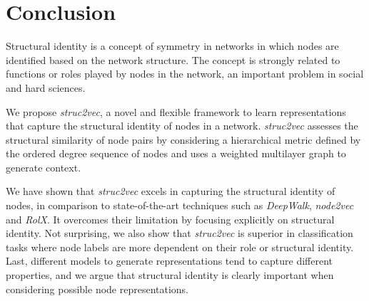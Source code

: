 \documentclass[sigconf]{acmart}
\begin{document}
  \section{Conclusion}
\label{sec:conclusion}

Structural identity is a concept of symmetry in networks in which nodes are identified based on the network structure. The concept is strongly related to functions or roles played by nodes in the network, an important problem in social and hard sciences. 

We propose \textit{struc2vec}, a novel and flexible framework to learn representations that capture the structural identity of nodes in a network. \textit{struc2vec} assesses the structural similarity of node pairs by considering a hierarchical metric defined by the ordered degree sequence of nodes and uses a weighted multilayer graph to generate context. 

We have shown that \textit{struc2vec} excels in capturing the structural identity of nodes, in comparison to state-of-the-art techniques such as \textit{DeepWalk}, \textit{node2vec} and \textit{RolX}. It overcomes their limitation by focusing explicitly on structural identity. Not surprising, we also show that \textit{struc2vec} is superior in classification tasks where node labels are more dependent on their role or structural identity. Last, different models to generate representations tend to capture different properties, and we argue that structural identity is clearly important when considering possible node representations.




  

 
\end{document}
